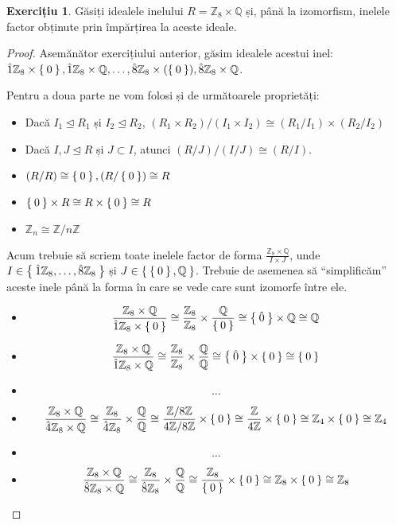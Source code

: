 \documentclass[11pt]{article}
\theoremstyle{definition}
\newtheorem*{exercise}{Exercițiu}
\begin{document}
\begin{exercise}
Găsiți idealele inelului \(R = \mathbb{Z}_8 \times \mathbb{Q}\) și, până la izomorfism, inelele factor obținute prin împărțirea la aceste ideale.
\end{exercise}
\begin{proof}
Asemănător exercițiului anterior, găsim idealele acestui inel: \(\hat{1} \mathbb{Z}_8 \times \Set{0}, \hat{1} \mathbb{Z}_8 \times \mathbb{Q}, \dots, \hat{8}\mathbb{Z}_8 \times(\Set{0}), \hat{8}\mathbb{Z}_8 \times \mathbb{Q}\).

Pentru a doua parte ne vom folosi și de următoarele proprietăți:
\begin{itemize}
    \item Dacă \(I_1 \trianglelefteq R_1\) și \(I_2 \trianglelefteq R_2\), \((R_1 \times R_2) / (I_1 \times I_2) \cong (R_1 / I_1) \times (R_2 / I_2)\)
    \item Dacă \(I, J \trianglelefteq R\) și \(J \subset I\), atunci \((R / J) / (I / J) \cong (R / I)\).
    \item \((R / R) \cong \Set{0}, (R / \Set{0}) \cong R\)
    \item \(\Set{0} \times R \cong R \times \Set{0} \cong R\)
    \item \(\mathbb{Z}_n \cong \mathbb{Z} / n\mathbb{Z}\)
\end{itemize}

Acum trebuie să scriem toate inelele factor de forma \(\frac{\mathbb{Z}_8 \times \mathbb{Q}}{I \times J}\), unde \(I \in \Set{ \hat{1}\mathbb{Z}_8, \dots, \hat{8}\mathbb{Z}_8 }\) și \(J \in \Set{ \Set{0}, \mathbb{Q} }\).
Trebuie de asemenea să ``simplificăm'' aceste inele până la forma în care se vede care sunt izomorfe între ele.
\begin{itemize}
    \item \[
    \frac{\mathbb{Z}_8 \times \mathbb{Q}}{\hat{1} \mathbb{Z}_8 \times \Set{0}}
    \cong \frac{\mathbb{Z}_8}{\mathbb{Z}_8} \times \frac{\mathbb{Q}}{\Set{0}}
    \cong \Set{\hat{0}} \times \mathbb{Q} \cong \mathbb{Q}
    \]
    \item \[
    \frac{\mathbb{Z}_8 \times \mathbb{Q}}{\hat{1} \mathbb{Z}_8 \times \mathbb{Q}}
    \cong \frac{\mathbb{Z}_8}{\mathbb{Z}_8} \times \frac{\mathbb{Q}}{\mathbb{Q}}
    \cong \Set{\hat{0}} \times \Set{0} \cong \Set{0}
    \]
    \item \[
    \dots
    \]
    \item \[
    \frac{\mathbb{Z}_8 \times \mathbb{Q}}{\hat{4} \mathbb{Z}_8 \times \mathbb{Q}}
    \cong \frac{\mathbb{Z}_8}{\hat{4}\mathbb{Z}_8} \times \frac{\mathbb{Q}}{\mathbb{Q}}
    \cong \frac{\mathbb{Z} / 8\mathbb{Z}}{4\mathbb{Z} / 8\mathbb{Z}} \times \Set{0}
    \cong \frac{\mathbb{Z}}{4\mathbb{Z}} \times \Set{0}
    \cong \mathbb{Z}_4 \times \Set{0}
    \cong \mathbb{Z}_4
    \]
    \item \[
    \dots
    \]
    \item \[
    \frac{\mathbb{Z}_8 \times \mathbb{Q}}{\hat{8} \mathbb{Z}_8 \times \mathbb{Q}}
    \cong \frac{\mathbb{Z}_8}{\hat{8}\mathbb{Z}_8} \times \frac{\mathbb{Q}}{\mathbb{Q}}
    \cong \frac{\mathbb{Z}_8}{\Set{0}} \times \Set{0}
    \cong \mathbb{Z}_8 \times \Set{0}
    \cong \mathbb{Z}_8
    \]
\end{itemize}
\end{proof}
\end{document}
